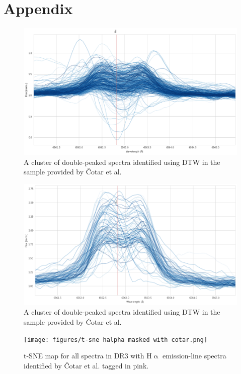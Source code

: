 \chapter{Appendix}

\begin{figure}[!htb]
\centering
\includegraphics[scale=0.42]{figures/cotar_class_4_10.png}
\caption{A cluster of double-peaked spectra identified using DTW in the sample provided by Čotar et al.}
\end{figure}

\begin{figure}[!htb]
\centering
\includegraphics[scale=0.42]{figures/cotar_class_6_10.png}
\caption{A cluster of double-peaked spectra identified using DTW in the sample provided by Čotar et al.}
\end{figure}

\begin{figure}[!htb]
\centering
\texttt{[image: figures/t-sne halpha masked with cotar.png]}
\caption{t-SNE map for all spectra in DR3 with H$\upalpha$ emission-line spectra identified by Čotar et al. tagged in pink.}
\end{figure}

